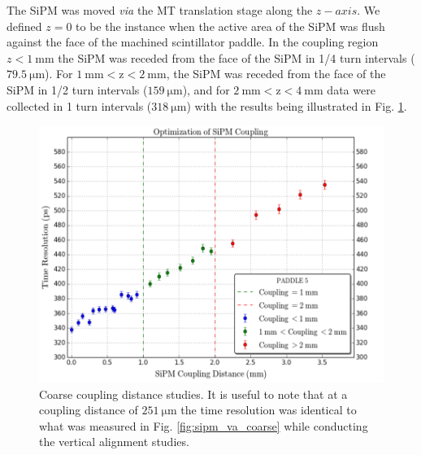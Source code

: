 The SiPM was moved \textit{via} the MT translation stage along the $z-axis$.  We defined $z = 0$ to be the instance when the active area of the SiPM was flush against the face of the machined scintillator paddle.  In the coupling region $z < 1\ \mathrm{mm}$ the SiPM was receded from the face of the SiPM in 1/4 turn intervals ($79.5\ \mathrm{\mu m}$).  For $\mathrm{1\ mm < z < 2\ mm}$, the SiPM was receded from the face of the SiPM in 1/2 turn intervals ($159\ \mathrm{\mu m}$), and for $\mathrm{2\ mm < z < 4\ mm}$ data were collected in 1 turn intervals ($\mathrm{318\ \mu m}$) with the results being illustrated in Fig. \ref{fig:sipm_coupling_coarse}.
	\begin{figure}[!htb]
		\centering
		\includegraphics[width=1.0\columnwidth]{misalignment/figs/sipm_coupling_coarse}
		\caption{Coarse coupling distance studies.  It is useful to note that at a coupling distance of $\mathrm{251\ \mu m}$ the time resolution was identical to what was measured in Fig. \ref{fig:sipm_va_coarse} while conducting the vertical alignment studies.}
		\label{fig:sipm_coupling_coarse}
	\end{figure}

